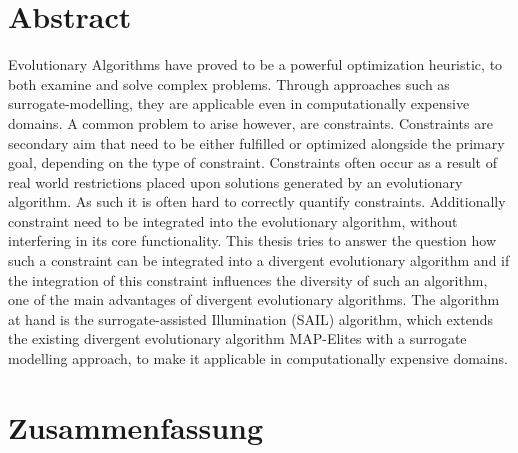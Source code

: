 
\clearpage
\section*{Abstract}
Evolutionary Algorithms have proved to be a powerful optimization heuristic, to both examine and solve complex problems.
Through approaches such as surrogate-modelling, they are applicable even in computationally expensive domains.
A common problem to arise however, are constraints.
Constraints are secondary aim that need to be either fulfilled or optimized alongside the primary goal, depending on the type of constraint.
Constraints often occur as a result of real world restrictions placed upon solutions generated by an evolutionary algorithm.
As such it is often hard to correctly quantify constraints.
Additionally constraint need to be integrated into the evolutionary algorithm, without interfering in its core functionality.
This thesis tries to answer the question how such a constraint can be integrated into a divergent evolutionary algorithm and if the integration of this constraint influences the diversity of such an algorithm, one of the main advantages of divergent evolutionary algorithms.
The algorithm at hand is the surrogate-assisted Illumination (SAIL) algorithm, which extends the existing divergent evolutionary algorithm MAP-Elites with a surrogate modelling approach, to make it applicable in computationally expensive domains.

\clearpage
\section*{Zusammenfassung}

